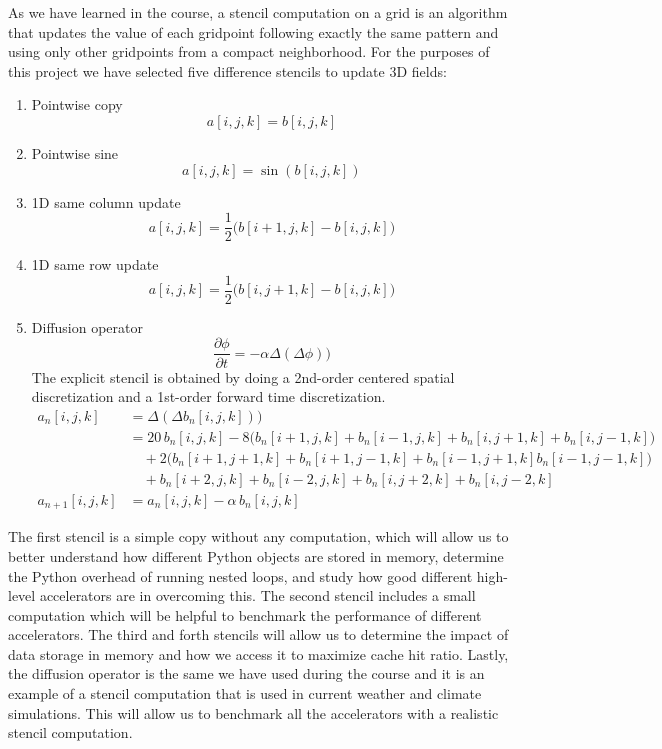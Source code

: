 \documentclass[12pt]{article}
\begin{document}
As we have learned in the course, a stencil computation on a grid is an algorithm that updates the value of each gridpoint following exactly the same pattern and using only other gridpoints from a compact neighborhood. For the purposes of this project we have selected five difference stencils to update 3D fields:

\begin{enumerate}
    \item Pointwise copy
    \begin{equation*}
        a[i,j,k] = b[i,j,k]
    \end{equation*}
    \item Pointwise sine
    \begin{equation*}
        a[i,j,k] = \sin(b[i,j,k])
    \end{equation*}
    \item 1D same column update
    \begin{equation*}
        a[i,j,k] = \frac{1}{2}\Big(b[i+1,j,k] - b[i,j,k]\Big)
    \end{equation*}
    \item 1D same row update
    \begin{equation*}
        a[i,j,k] = \frac{1}{2}\Big(b[i,j+1,k] - b[i,j,k]\Big)
    \end{equation*}
    \item Diffusion operator
    \begin{equation*}
        \frac{\partial\phi}{\partial t} = -\alpha \Delta(\Delta\phi))
    \end{equation*}
    The explicit stencil is obtained by doing a 2nd-order centered spatial discretization and a 1st-order forward time discretization.
    \begin{align*}
    a_n[i,j,k] &= \Delta(\Delta b_n[i,j,k])) \\
    &= 20\, b_n[i,j,k] - 8 \Big(b_n[i+1,j,k] + b_n[i-1,j,k] + b_n[i,j+1,k] + b_n[i,j-1,k]\Big)\\
    &\quad + 2\Big(b_n[i+1,j+1,k] + b_n[i+1,j-1,k] + b_n[i-1,j+1,k] b_n[i-1,j-1,k]\Big) \\
    &\quad + b_n[i+2,j,k] + b_n[i-2,j,k] + b_n[i,j+2,k] + b_n[i,j-2,k]\\
    a_{n+1}[i,j,k] &= a_n[i,j,k] - \alpha\, b_n[i,j,k]
    \end{align*}
\end{enumerate}

The first stencil is a simple copy without any computation, which will allow us to better understand how different Python objects are stored in memory, determine the Python overhead of running nested loops, and study how good different high-level accelerators are in overcoming this. The second stencil includes a small computation which will be helpful to benchmark the performance of different accelerators. The third and forth stencils will allow us to determine the impact of data storage in memory and how we access it to maximize cache hit ratio. Lastly, the diffusion operator is the same we have used during the course and it is an example of a stencil computation that is used in current weather and climate simulations. This will allow us to benchmark all the accelerators with a realistic stencil computation.
\end{document}
